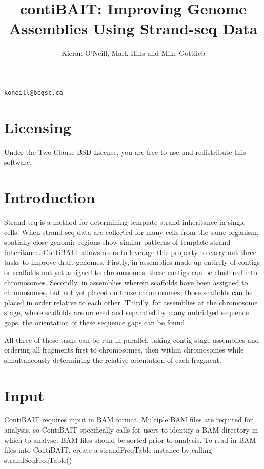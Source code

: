 \documentclass{article}
\title{contiBAIT: Improving Genome Assemblies Using Strand-seq Data}
\author{Kieran O'Neill, Mark Hills and Mike Gottlieb}
\begin{document}


\maketitle
\begin{center}
{\tt koneill@bcgsc.ca}
\end{center}

\textnormal{\normalfont}

\tableofcontents
\newpage

\section{Licensing}
Under the Two-Clause BSD License, you are free to use and redistribute this software.

\section{Introduction}
Strand-seq is a method for determining template strand inheritance in single cells.
When strand-seq data are collected for many cells from the same organism, spatially close genomic regions show similar patterns of template strand inheritance.
ContiBAIT allows users to leverage this property to carry out three tasks to improve draft genomes. Firstly, in assemblies made up entirely of contigs or scaffolds not yet assigned to chromosomes, these contigs can be clustered into chromosomes. Secondly, in assemblies wherein scaffolds have been assigned to chromosomes, but not yet placed on those chromosomes, those scaffolds can be placed in order relative to each other. Thirdly, for assemblies at the chromosome stage, where scaffolds are ordered and separated by many unbridged sequence gaps, the orientation of these sequence gaps can be found.  

All three of these tasks can be run in parallel, taking contig-stage assemblies and ordering all fragments first to chromosomes, then within chromosomes while simultaneously determining the relative orientation of each fragment.

\section{Input}
ContiBAIT requires input in BAM format. Multiple BAM files are required for analysis, so ContiBAIT specifically calls for users to identify a BAM directory in which to analyse. BAM files should be sorted prior to analysis.
To read in BAM files into ContiBAIT, create a strandFreqTable instance by calling strandSeqFreqTable() 
\end{document}
